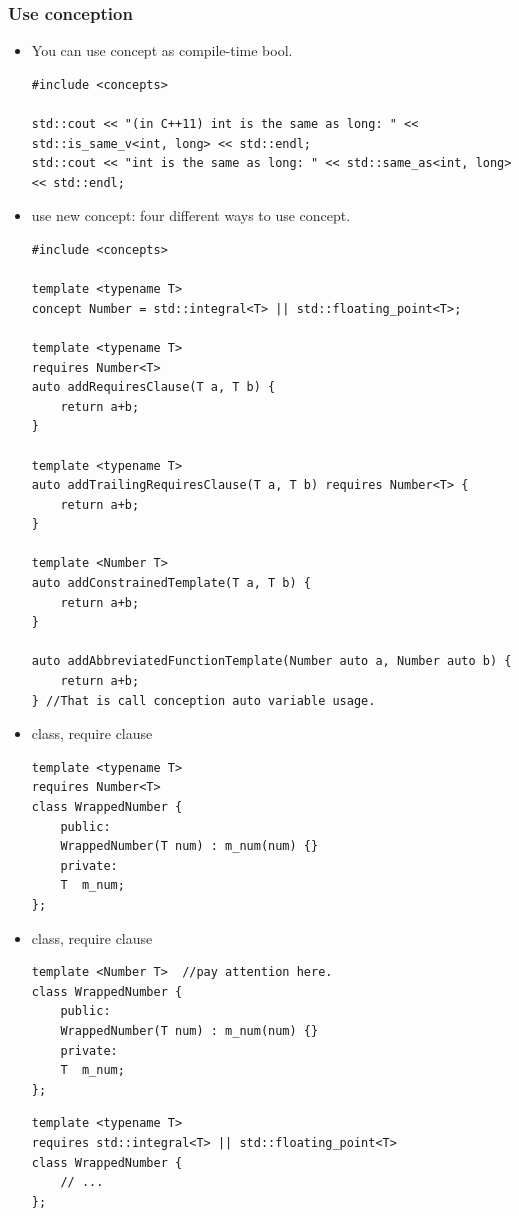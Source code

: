\documentclass[a4paper,11pt,twoside]{book}
\begin{document}
\subsubsection{Use conception}
\begin{itemize}
    \item You can use concept as compile-time bool.

\begin{lstlisting}
#include <concepts>

std::cout << "(in C++11) int is the same as long: " << std::is_same_v<int, long> << std::endl;
std::cout << "int is the same as long: " << std::same_as<int, long> << std::endl;
\end{lstlisting}

    \item use new concept: four different ways to use concept.
\begin{lstlisting}
#include <concepts>

template <typename T>
concept Number = std::integral<T> || std::floating_point<T>;

template <typename T>
requires Number<T>
auto addRequiresClause(T a, T b) {
	return a+b;
}

template <typename T>
auto addTrailingRequiresClause(T a, T b) requires Number<T> {
	return a+b;
}

template <Number T>
auto addConstrainedTemplate(T a, T b) {
	return a+b;
}

auto addAbbreviatedFunctionTemplate(Number auto a, Number auto b) {
	return a+b;
} //That is call conception auto variable usage.
\end{lstlisting}


\item class, require clause
\begin{lstlisting}
template <typename T>
requires Number<T>
class WrappedNumber {
	public:
	WrappedNumber(T num) : m_num(num) {}
	private:
	T  m_num;
};
\end{lstlisting}

\item class, require clause
\begin{lstlisting}
template <Number T>  //pay attention here.
class WrappedNumber {
	public:
	WrappedNumber(T num) : m_num(num) {}
	private:
	T  m_num;
};
\end{lstlisting}

\begin{lstlisting}
template <typename T>
requires std::integral<T> || std::floating_point<T>
class WrappedNumber {
	// ...
};
\end{lstlisting}

\end{itemize}
\end{document}
